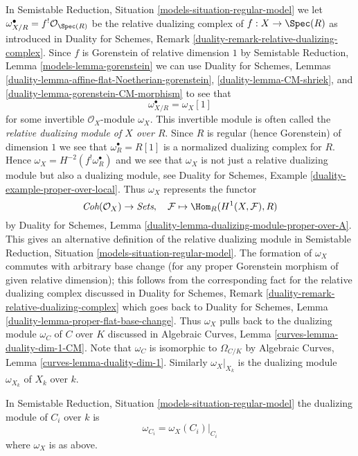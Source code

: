 \noindent
In Semistable Reduction, Situation \ref{models-situation-regular-model} we let
$\omega_{X/R}^\bullet = f^!\mathcal{O}_{\Spec(R)}$
be the relative dualizing complex of $f : X \to \Spec(R)$
as introduced in
Duality for Schemes, Remark \ref{duality-remark-relative-dualizing-complex}.
Since $f$ is Gorenstein of relative dimension $1$
by Semistable Reduction, Lemma \ref{models-lemma-gorenstein} we can use
Duality for Schemes, Lemmas
\ref{duality-lemma-affine-flat-Noetherian-gorenstein},
\ref{duality-lemma-CM-shriek}, and
\ref{duality-lemma-gorenstein-CM-morphism}
to see that
$$
\omega_{X/R}^\bullet = \omega_X[1]
$$
for some invertible $\mathcal{O}_X$-module $\omega_X$.
This invertible module is often called the
{\it relative dualizing module of $X$ over $R$}.
Since $R$ is regular (hence Gorenstein) of dimension $1$
we see that $\omega_R^\bullet = R[1]$ is a
normalized dualizing complex for $R$. Hence
$\omega_X = H^{-2}(f^!\omega_R^\bullet)$ and we
see that $\omega_X$ is not just a relative dualizing module
but also a dualizing module, see
Duality for Schemes, Example \ref{duality-example-proper-over-local}.
Thus $\omega_X$ represents the functor
$$
\textit{Coh}(\mathcal{O}_X) \to \textit{Sets},\quad
\mathcal{F} \mapsto \Hom_R(H^1(X, \mathcal{F}), R)
$$
by Duality for Schemes, Lemma
\ref{duality-lemma-dualizing-module-proper-over-A}.
This gives an alternative definition of the relative
dualizing module in
Semistable Reduction, Situation \ref{models-situation-regular-model}.
The formation of $\omega_X$ commutes with arbitrary base change
(for any proper Gorenstein morphism of given relative dimension);
this follows from the corresponding fact for the relative dualizing
complex discussed in
Duality for Schemes, Remark \ref{duality-remark-relative-dualizing-complex}
which goes back to
Duality for Schemes, Lemma \ref{duality-lemma-proper-flat-base-change}.
Thus $\omega_X$ pulls back to the dualizing module $\omega_C$ of $C$ over $K$
discussed in Algebraic Curves, Lemma \ref{curves-lemma-duality-dim-1-CM}.
Note that $\omega_C$ is isomorphic to $\Omega_{C/K}$ by
Algebraic Curves, Lemma \ref{curves-lemma-duality-dim-1}.
Similarly $\omega_X|_{X_k}$ is the dualizing module $\omega_{X_k}$
of $X_k$ over $k$.

\begin{lemma}
\label{lemma-dualizing-components}
In Semistable Reduction, Situation \ref{models-situation-regular-model}
the dualizing module of $C_i$ over $k$ is
$$
\omega_{C_i} = \omega_X(C_i)|_{C_i}
$$
where $\omega_X$ is as above.
\end{lemma}

